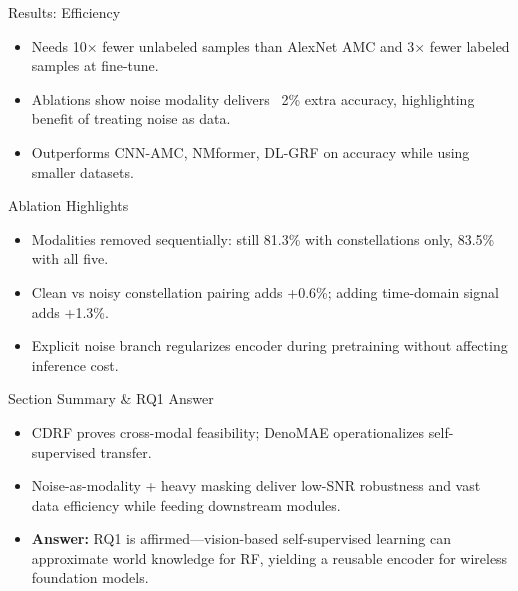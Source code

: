 \begin{frame}{Results: Efficiency}
    \begin{itemize}
        \item Needs 10× fewer unlabeled samples than AlexNet AMC and 3× fewer labeled samples at fine-tune.
        \item Ablations show noise modality delivers ~2\% extra accuracy, highlighting benefit of treating noise as data.
        \item Outperforms CNN-AMC, NMformer, DL-GRF on accuracy while using smaller datasets.
    \end{itemize}
\end{frame}

\begin{frame}{Ablation Highlights}
    \begin{itemize}
        \item Modalities removed sequentially: still 81.3\% with constellations only, 83.5\% with all five.
        \item Clean vs noisy constellation pairing adds +0.6\%; adding time-domain signal adds +1.3\%.
        \item Explicit noise branch regularizes encoder during pretraining without affecting inference cost.
    \end{itemize}
\end{frame}

\begin{frame}{Section Summary \& RQ1 Answer}
    \begin{itemize}
        \item CDRF proves cross-modal feasibility; DenoMAE operationalizes self-supervised transfer.
        \item Noise-as-modality + heavy masking deliver low-SNR robustness and vast data efficiency while feeding downstream modules.
        \item \textbf{Answer:} RQ1 is affirmed—vision-based self-supervised learning can approximate world knowledge for RF, yielding a reusable encoder for wireless foundation models.
    \end{itemize}
\end{frame}

